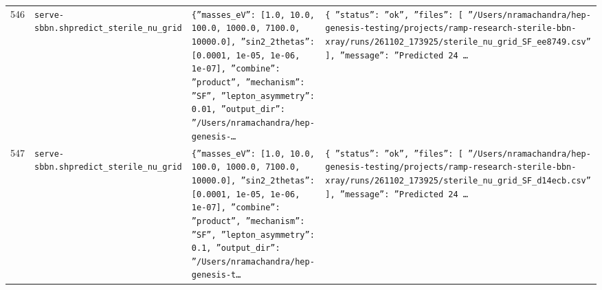 \documentclass[11pt,a4paper]{article}
\begin{document}
\begin{longtable}{@{}p{}p{}p{}p{}@{}}
546 & \texttt{serve-sbbn.sh}\newline\texttt{predict\_\allowbreak{}sterile\_\allowbreak{}nu\_\allowbreak{}grid} & \texttt{\{''masses\_\allowbreak{}eV'':\allowbreak{} [1.0,\allowbreak{} 10.0,\allowbreak{} 100.0,\allowbreak{} 1000.0,\allowbreak{} 7100.0,\allowbreak{} 10000.0]\allowbreak{},\allowbreak{} ''sin2\_\allowbreak{}2thetas'':\allowbreak{} [0.0001,\allowbreak{} 1e-05,\allowbreak{} 1e-06,\allowbreak{} 1e-07]\allowbreak{},\allowbreak{} ''combine'':\allowbreak{} ''product'',\allowbreak{} ''mechanism'':\allowbreak{} ''SF'',\allowbreak{} ''lepton\_\allowbreak{}asymmetry'':\allowbreak{} 0.01,\allowbreak{} ''output\_\allowbreak{}dir'':\allowbreak{} ''/\allowbreak{}Users/\allowbreak{}nramachandra/\allowbreak{}hep-genesis-\ldots{}\allowbreak{}} & \texttt{\{   ''status'':\allowbreak{} ''ok'',\allowbreak{}   ''files'':\allowbreak{} [     ''/\allowbreak{}Users/\allowbreak{}nramachandra/\allowbreak{}hep-genesis-testing/\allowbreak{}projects/\allowbreak{}ramp-research-sterile-bbn-xray/\allowbreak{}runs/\allowbreak{}261102\_\allowbreak{}173925/\allowbreak{}sterile\_\allowbreak{}nu\_\allowbreak{}grid\_\allowbreak{}SF\_\allowbreak{}ee8749.csv''   ]\allowbreak{},\allowbreak{}   ''message'':\allowbreak{} ''Predicted 24 \ldots{}\allowbreak{}} \\
547 & \texttt{serve-sbbn.sh}\newline\texttt{predict\_\allowbreak{}sterile\_\allowbreak{}nu\_\allowbreak{}grid} & \texttt{\{''masses\_\allowbreak{}eV'':\allowbreak{} [1.0,\allowbreak{} 10.0,\allowbreak{} 100.0,\allowbreak{} 1000.0,\allowbreak{} 7100.0,\allowbreak{} 10000.0]\allowbreak{},\allowbreak{} ''sin2\_\allowbreak{}2thetas'':\allowbreak{} [0.0001,\allowbreak{} 1e-05,\allowbreak{} 1e-06,\allowbreak{} 1e-07]\allowbreak{},\allowbreak{} ''combine'':\allowbreak{} ''product'',\allowbreak{} ''mechanism'':\allowbreak{} ''SF'',\allowbreak{} ''lepton\_\allowbreak{}asymmetry'':\allowbreak{} 0.1,\allowbreak{} ''output\_\allowbreak{}dir'':\allowbreak{} ''/\allowbreak{}Users/\allowbreak{}nramachandra/\allowbreak{}hep-genesis-t\ldots{}\allowbreak{}} & \texttt{\{   ''status'':\allowbreak{} ''ok'',\allowbreak{}   ''files'':\allowbreak{} [     ''/\allowbreak{}Users/\allowbreak{}nramachandra/\allowbreak{}hep-genesis-testing/\allowbreak{}projects/\allowbreak{}ramp-research-sterile-bbn-xray/\allowbreak{}runs/\allowbreak{}261102\_\allowbreak{}173925/\allowbreak{}sterile\_\allowbreak{}nu\_\allowbreak{}grid\_\allowbreak{}SF\_\allowbreak{}d14ecb.csv''   ]\allowbreak{},\allowbreak{}   ''message'':\allowbreak{} ''Predicted 24 \ldots{}\allowbreak{}} \\

\end{longtable}
\end{document}
